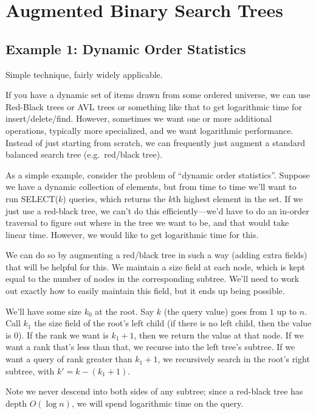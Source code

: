 \documentclass{article}
\begin{document}
\section{Augmented Binary Search Trees}

\subsection{Example 1: Dynamic Order Statistics}

Simple technique, fairly widely applicable.

If you have a dynamic set of items drawn from some ordered universe, we
can use Red-Black trees or AVL trees or something like that to get
logarithmic time for insert/delete/find.
However, sometimes we want one or more additional operations, typically
more specialized, and we want logarithmic performance.
Instead of just starting from scratch, we can frequently just augment
a standard balanced search tree (e.g.\ red/black tree).

As a simple example, consider the problem of ``dynamic order statistics''.
Suppose we have a dynamic collection of elements, but from time to time
we'll want to run SELECT($k$) queries, which returns the $k$th highest
element in the set.
If we just use a red-black tree, we can't do this efficiently---we'd have
to do an in-order traversal to figure out where in the tree we want to be,
and that would take linear time.
However, we would like to get logarithmic time for this.

We can do so by augmenting a red/black tree in such
a way (adding extra fields) that will be helpful for this.
We maintain a size field at each node, which is kept equal
to the number of nodes in the corresponding subtree.
We'll need to work out exactly how to easily maintain this field, but it
ends up being possible.

We'll have some size $k_0$ at the root.
Say $k$ (the query value) goes from $1$ up to $n$.
Call $k_1$ the size field of the root's left child (if there is no left
child, then the value is 0).
If the rank we want is $k_1 + 1$, then we return the value at that node.
If we want a rank that's less than that, we recurse into the left tree's
subtree.
If we want a query of rank greater than $k_1 + 1$, we recursively search in
the root's right subtree, with $k' = k - (k_1 + 1)$.

Note we never descend into both sides of any subtree; since a red-black tree
has depth $O(\log n)$, we will spend logarithmic time on the query.
\end{document}
